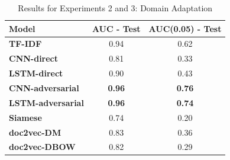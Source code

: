 \documentclass{sigkddExp}
\begin{document}
\begin{table}[h]
    \begin{tabular}{ l  c  c}
    \toprule
    \textbf{Model}
    & \textbf{AUC - Test}
    & \textbf{AUC(0.05) - Test}
    \\
    \toprule
    \textbf{TF-IDF}
    & 0.94
    & 0.62
    \\
    \cmidrule{1-1} 
    \textbf{CNN-direct}
    & 0.81
    & 0.33
    \\
    \cmidrule{1-1} 
    \textbf{LSTM-direct}
    & 0.90
    & 0.43
    \\
    \midrule
    \textbf{CNN-adversarial}
    & \textbf{0.96}
    & \textbf{0.76}
    \\
    \cmidrule{1-1} 
    \textbf{LSTM-adversarial}
    & \textbf{0.96}
    & \textbf{0.74}
    \\
    \midrule
    \textbf{Siamese}
    & 0.74
    & 0.20
    \\
    \cmidrule{1-1} 
    \textbf{doc2vec-DM}
    & 0.83
    & 0.36
    \\
    \cmidrule{1-1}
    \textbf{doc2vec-DBOW}
    & 0.82
    & 0.29    
    \\
    \bottomrule
    \end{tabular}
    \caption{Results for Experiments 2 and 3: Domain Adaptation}
    \label{tab:exp23}
\end{table}
\end{document}
